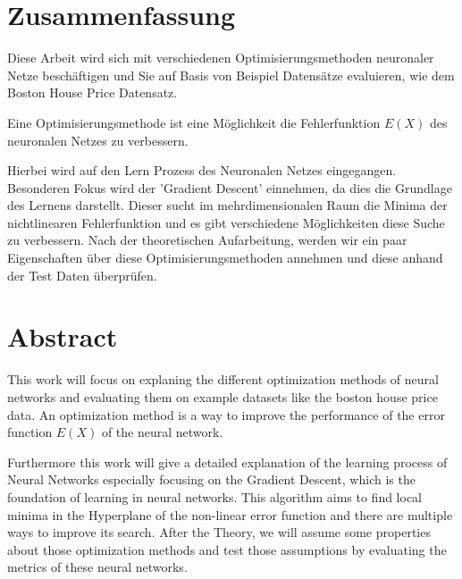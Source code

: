 \section*{Zusammenfassung}

Diese Arbeit wird sich mit verschiedenen Optimisierungsmethoden neuronaler Netze beschäftigen und Sie auf Basis von Beispiel Datensätze evaluieren, wie dem Boston House Price Datensatz.

Eine Optimisierungsmethode ist eine Möglichkeit die Fehlerfunktion $E(X)$ des neuronalen Netzes zu verbessern. 
 
Hierbei wird auf den Lern Prozess des Neuronalen Netzes eingegangen. Besonderen Fokus wird der 'Gradient Descent' einnehmen, da dies die Grundlage des Lernens darstellt. Dieser sucht im mehrdimensionalen Raum die Minima der nichtlinearen Fehlerfunktion und es gibt verschiedene Möglichkeiten diese Suche zu verbessern.   
Nach der theoretischen Aufarbeitung, werden wir ein paar Eigenschaften über diese Optimisierungsmethoden annehmen und diese anhand der Test Daten überprüfen.

\section*{Abstract}

This work will focus on explaning the different optimization methods of neural networks and evaluating them
on example datasets like the boston house price data.
An optimization method is a way to improve the performance of the error 
function $E(X)$ of the neural network. 

Furthermore this work will give a detailed explanation of the learning process of Neural Networks
especially focusing on the Gradient Descent, which is the foundation of learning in neural networks. This algorithm aims to find local minima in the Hyperplane of the non-linear error function and there are multiple ways to improve its search. 
After the Theory, we will assume some properties about those optimization methods and test those assumptions
by evaluating the metrics of these neural networks.

